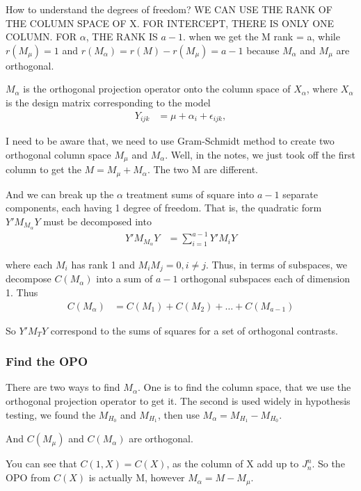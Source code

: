 How to understand the degrees of freedom? 
WE CAN USE THE RANK OF THE COLUMN SPACE OF X. FOR INTERCEPT, THERE IS ONLY ONE COLUMN. FOR $\alpha$, THE RANK IS $a-1$.
when we get the M rank = a, while $r(M_{\mu}) = 1$ and $r(M_{\alpha}) = r(M) - r(M_{\mu}) = a-1$ because $M_{\alpha}$ and $M_{\mu}$ are orthogonal.


$M_{\alpha}$ is the orthogonal projection operator onto the column space of $X_{\alpha}$, where $X_{\alpha}$ is the design matrix corresponding to the model
 \begin{align*}
    Y_{ijk} &= \mu + \alpha_i +  \epsilon_{ijk},  
\end{align*}

I need to be aware that, we need to use Gram-Schmidt method to create two orthogonal column space $M_{\mu}$ and $M_{\alpha}$. Well, in the notes, we just took off the first column to get the $M = M_{\mu} + M_{\alpha}$. The two M are different.

And we can break up the $\alpha$ treatment sums of square into $a-1$ separate components, each having 1 degree of freedom. That is, the quadratic form $Y'M_{M_{\alpha}} Y$ must be decomposed into
 \begin{align*}
    Y'M_{M_{\alpha}} Y &= \sum_{i=1}^{a-1} Y'M_i Y  
\end{align*}

where each $M_i$ has rank 1 and $M_iM_j = 0, i \neq j$. Thus, in terms of subspaces, we decompose $C(M_{\alpha})$ into a sum of $a-1$ orthogonal subspaces each of dimension 1. Thus
 \begin{align*}
    C(M_{\alpha}) &= C(M_{1}) + C(M_2) +… + C(M_{a-1}) 
\end{align*}

So $Y'M_TY$ correspond to the sums of squares for a set of orthogonal contrasts. 


\subsubsection{Find the OPO}

There are two ways to find $M_{\alpha}$. One is to find the column space, that we use the orthogonal projection operator to get it. The second is used widely in hypothesis testing, we found the $M_{H_0}$ and $M_{H_1}$, then use $M_{\alpha} = M_{H_1} - M_{H_0}$. 

And $C(M_{\mu})$ and $C(M_{\alpha})$ are orthogonal. 

You can see that $C(1, X) = C(X)$, as the column of X add up to $J_n^n$. So the OPO from $C(X)$ is actually M, however $M_{\alpha} = M - M_{\mu}$.




